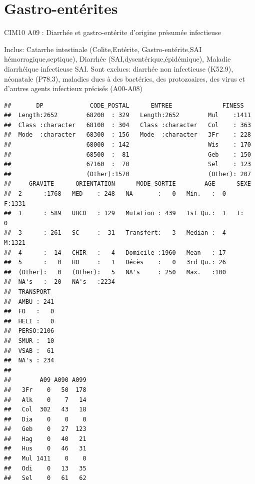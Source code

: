\documentclass[12pt,english,french,twoside]{book}\usepackage[]{graphicx}\usepackage[]{color}
\makeatletter
\newenvironment{kframe}{%
 \def\at@end@of@kframe{}%
 \ifinner\ifhmode%
  \def\at@end@of@kframe{\end{minipage}}%
  \begin{minipage}{\columnwidth}%
 \fi\fi%
 \def\FrameCommand##1{\hskip\@totalleftmargin \hskip-\fboxsep
 \colorbox{shadecolor}{##1}\hskip-\fboxsep
     \hskip-\linewidth \hskip-\@totalleftmargin \hskip\columnwidth}%
 \MakeFramed {\advance\hsize-\width
   \@totalleftmargin\z@ \linewidth\hsize
   \@setminipage}}%
 {\par\unskip\endMakeFramed%
 \at@end@of@kframe}
\newenvironment{knitrout}{}{} %
\makeatother
\begin{document}
\section{Gastro-entérites}

CIM10 A09 : Diarrhée et gastro-entérite d'origine présumée infectieuse

Inclus: Catarrhe intestinale (Colite,Entérite, Gastro-entérite,SAI hémorragique,septique), Diarrhée (SAI,dysentérique,épidémique), Maladie diarrhéique infectieuse SAI.
Sont exclues: diarrhée non infectieuse (K52.9), néonatale (P78.3), maladies dues à des bactéries, des protozoaires, des virus et d'autres agents infectieux précisés (A00-A08)  

\begin{knitrout}
\color{fgcolor}\begin{kframe}
\begin{verbatim}
##       DP             CODE_POSTAL      ENTREE              FINESS    
##  Length:2652        68200  : 329   Length:2652        Mul    :1411  
##  Class :character   68100  : 304   Class :character   Col    : 363  
##  Mode  :character   68300  : 156   Mode  :character   3Fr    : 228  
##                     68000  : 142                      Wis    : 170  
##                     68500  :  81                      Geb    : 150  
##                     67160  :  70                      Sel    : 123  
##                     (Other):1570                      (Other): 207  
##     GRAVITE      ORIENTATION      MODE_SORTIE        AGE      SEXE    
##  2      :1768   MED    : 248   NA       :   0   Min.   :  0   F:1331  
##  1      : 589   UHCD   : 129   Mutation : 439   1st Qu.:  1   I:   0  
##  3      : 261   SC     :  31   Transfert:   3   Median :  4   M:1321  
##  4      :  14   CHIR   :   4   Domicile :1960   Mean   : 17           
##  5      :   0   HO     :   1   Décès    :   0   3rd Qu.: 26           
##  (Other):   0   (Other):   5   NA's     : 250   Max.   :100           
##  NA's   :  20   NA's   :2234                                          
##  TRANSPORT   
##  AMBU : 241  
##  FO   :   0  
##  HELI :   0  
##  PERSO:2106  
##  SMUR :  10  
##  VSAB :  61  
##  NA's : 234
##      
##        A09 A090 A099
##   3Fr    0   50  178
##   Alk    0    7   14
##   Col  302   43   18
##   Dia    0    0    0
##   Geb    0   27  123
##   Hag    0   40   21
##   Hus    0   46   31
##   Mul 1411    0    0
##   Odi    0   13   35
##   Sel    0   61   62

\end{verbatim}
\end{kframe}
\end{knitrout}
\end{document}
